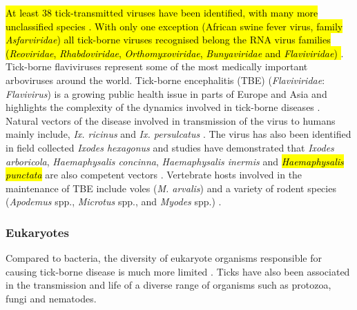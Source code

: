 \documentclass[a4paper, nobind]{templates/ociamthesis}
\begin{document}
\hl{At least 38 tick-transmitted viruses have been identified, with many more unclassified species \autocite{labudaTickborneViruses2004}. With only one exception (African swine fever virus, family \emph{Asfarviridae}) all tick-borne viruses recognised belong the RNA virus families (\emph{Reoviridae}, \emph{Rhabdoviridae}, \emph{Orthomyxoviridae}, \emph{Bunyaviridae} and \emph{Flaviviridae}) \autocite{labudaTickborneViruses2004}}.
Tick-borne flaviviruses represent some of the most medically important arboviruses around the world.
Tick-borne encephalitis (TBE) (\emph{Flaviviridae}: \emph{Flavivirus}) is a growing public health issue in parts of Europe and Asia and highlights the complexity of the dynamics involved in tick-borne diseases \autocite{gritsunTickborneEncephalitis2003}.
Natural vectors of the disease involved in transmission of the virus to humans mainly include, \emph{Ix. ricinus} and \emph{Ix. persulcatus} \autocite{labudaTickborneViruses2004,sussTickborneEncephalitis20102011}.
The virus has also been identified in field collected \emph{Ixodes hexagonus} and studies have demonstrated that \emph{Ixodes arboricola}, \emph{Haemaphysalis concinna}, \emph{Haemaphysalis inermis} and \hl{\emph{Haemaphysalis punctata}} are also competent vectors \autocite{gresikovaTickborneEncephalitis1998}.
Vertebrate hosts involved in the maintenance of TBE include voles (\emph{M. arvalis}) and a variety of rodent species (\emph{Apodemus} spp., \emph{Microtus} spp., and \emph{Myodes} spp.) \autocite{achaziRodentsSentinelsPrevalence2011}.

\hypertarget{eukaryotes}{%
\subsubsection{Eukaryotes}\label{eukaryotes}}

Compared to bacteria, the diversity of eukaryote organisms responsible for causing tick-borne disease is much more limited \autocite{tokarzDiscoverySurveillanceTickBorne2021}.
Ticks have also been associated in the transmission and life of a diverse range of organisms such as protozoa, fungi and nematodes.
\end{document}
